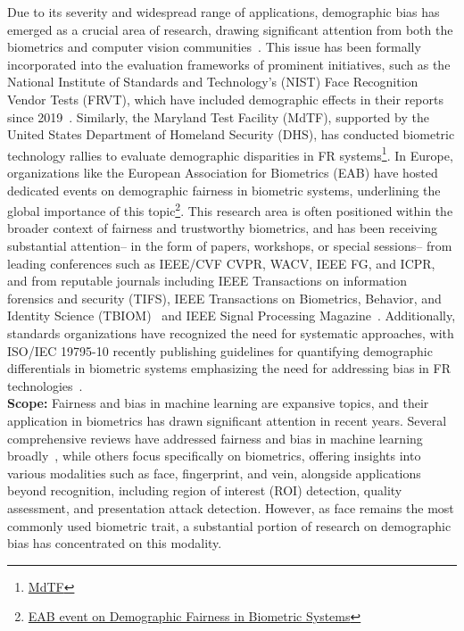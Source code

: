 Due to its severity and widespread range of applications, demographic bias has
emerged as a crucial area of research, drawing significant attention from both
the biometrics and computer vision communities~\cite{drozdowski2020demographic,
jain2021biometrics, ross2019some, busch2024challenges}. This issue has been
formally incorporated into the evaluation frameworks of prominent initiatives,
such as the National Institute of Standards and Technology's (NIST) Face
Recognition Vendor Tests (FRVT), which have included demographic effects in
their reports since 2019~\cite{frvt3, grother2021demographic}. Similarly, the
Maryland Test Facility (MdTF), supported by the United States Department of
Homeland Security (DHS), has conducted biometric technology rallies to evaluate
demographic disparities in FR systems\footnote{\href{https://mdtf.org}{MdTF}}.
In Europe, organizations like the European Association for Biometrics (EAB) have
hosted dedicated events on demographic fairness in biometric systems,
underlining the global importance of this
topic\footnote{\href{https://eab.org/events/program/237}{EAB event on
Demographic Fairness in Biometric Systems}}. This research area is often
positioned within the broader context of fairness and trustworthy biometrics,
and has been receiving substantial attention-- in the form of papers, workshops,
or special sessions-- from leading conferences such as IEEE/CVF CVPR, WACV, IEEE
FG, and ICPR, and from reputable journals including IEEE Transactions on
information forensics and security (TIFS), IEEE Transactions on Biometrics,
Behavior, and Identity Science (TBIOM)~\cite{9833480} and IEEE Signal Processing
Magazine~\cite{cheong2021hitchhiker}. Additionally, standards organizations have
recognized the need for systematic approaches, with ISO/IEC 19795-10 recently
publishing guidelines for quantifying demographic differentials in biometric
systems emphasizing the need for addressing bias in FR
technologies~\cite{british2023iso}.\\

\noindent\textbf{Scope:} Fairness and bias in machine learning are expansive
topics, and their application in biometrics has drawn significant attention in
recent years. Several comprehensive reviews have addressed fairness and bias in
machine learning broadly~\cite{mehrabi2021survey, pessach2022review}, while
others focus specifically on biometrics, offering insights into various
modalities such as face, fingerprint, and vein, alongside applications beyond
recognition, including region of interest (ROI) detection, quality assessment,
and presentation attack detection\cite{drozdowski2020demographic,
jain2021biometrics, ross2019some, yucer2023racial}. However, as face remains the
most commonly used biometric trait, a substantial portion of research on
demographic bias has concentrated on this modality. 

